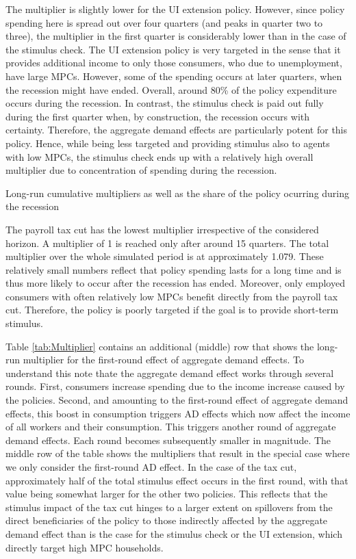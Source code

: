 \documentclass[../HAFiscal]{subfiles}
\begin{document}
The multiplier is slightly lower for the UI extension policy. However, since policy spending here is spread out over four quarters (and peaks in quarter two to three), the multiplier in the first quarter is considerably lower than in the case of the stimulus check. The UI extension policy is very targeted in the sense that it provides additional income to only those consumers, who due to unemployment, have large MPCs. However, some of the spending occurs at later quarters, when the recession might have ended. Overall, around 80\% of the policy expenditure occurs during the recession. In contrast, the stimulus check is paid out fully during the first quarter when, by construction, the recession occurs with certainty. Therefore, the aggregate demand effects are particularly potent for this policy. Hence, while being less targeted and providing stimulus also to agents with low MPCs, the stimulus check ends up with a relatively high overall multiplier due to concentration of spending during the recession.

\begin{table}[t]
	\center
	
	\caption{Long-run cumulative multipliers as well as the share of the policy ocurring during the recession}
	\label{tab:Multiplier}
\end{table}

The payroll tax cut has the lowest multiplier irrespective of the considered horizon. A multiplier of 1 is reached only after around 15 quarters. The total multiplier over the whole simulated period is at approximately 1.079. These relatively small numbers reflect that policy spending lasts for a long time and is thus more likely to occur after the recession has ended. Moreover, only employed consumers with often relatively low MPCs benefit directly from the payroll tax cut. Therefore, the policy is poorly targeted if the goal is to provide short-term stimulus. 

Table \ref{tab:Multiplier} contains an additional (middle) row that shows the long-run multiplier for the first-round effect of aggregate demand effects. To understand this note thate the aggregate demand effect works through several rounds. First, consumers increase spending due to the income increase caused by the policies. Second, and amounting to the first-round effect of aggregate demand effects, this boost in consumption triggers AD effects which now affect the income of all workers and their consumption. This triggers another round of aggregate demand effects. Each round becomes subsequently smaller in magnitude. The middle row of the table shows the multipliers that result in the special case where we only consider the first-round AD effect. In the case of the tax cut, approximately half of the total stimulus effect occurs in the first round, with that value being somewhat larger for the other two policies. This reflects that the stimulus impact of the tax cut hinges to a larger extent on spillovers from the direct beneficiaries of the policy to those indirectly affected by the aggregate demand effect than is the case for the stimulus check or the UI extension, which directly target high MPC households.
\end{document}
